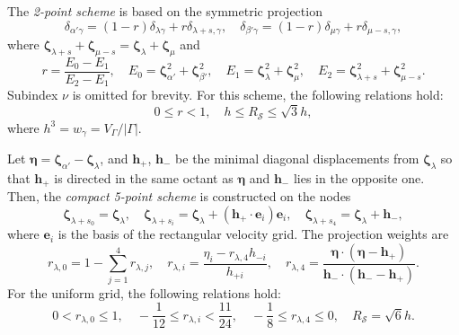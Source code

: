 \documentclass[10pt]{article}
\newcommand{\bzeta}{\boldsymbol{\zeta}}
\newcommand{\bh}{\boldsymbol{h}}
\newcommand{\be}{\boldsymbol{e}}
\begin{document}
The \emph{2-point scheme} is based on the symmetric projection
\begin{equation}\label{eq:uniform_projection}
    \delta_{\alpha'\gamma} = (1-r)\delta_{\lambda\gamma} + r\delta_{\lambda+s,\gamma}, \quad
    \delta_{\beta'\gamma} = (1-r)\delta_{\mu\gamma} + r\delta_{\mu-s,\gamma},
\end{equation}
where \(\bzeta_{\lambda+s} + \bzeta_{\mu-s} = \bzeta_{\lambda} + \bzeta_{\mu}\) and
\begin{equation}\label{eq:stencil_weights2}
    r = \frac{E_0-E_1}{E_2-E_1}, \quad
    E_0 = \bzeta_{\alpha'}^2 + \bzeta_{\beta'}^2, \quad
    E_1 = \bzeta_{\lambda}^2 + \bzeta_{\mu}^2, \quad
    E_2 = \bzeta_{\lambda+s}^2 + \bzeta_{\mu-s}^2.
\end{equation}
Subindex \(\nu\) is omitted for brevity.
For this scheme, the following relations hold:
\begin{equation}\label{eq:weights_ranges2}
    0 \leq r < 1, \quad h \leq R_{\mathcal{S}} \leq \sqrt3h,
\end{equation}
where \(h^3 = w_\gamma = V_\Gamma/|\Gamma|\).

Let \(\boldsymbol{\eta} = \bzeta_{\alpha'} - \bzeta_{\lambda}\),
and \(\bh_+\), \(\bh_-\) be the minimal diagonal displacements from \(\bzeta_{\lambda}\)
so that \(\bh_+\) is directed in the same octant as \(\boldsymbol{\eta}\)
and \(\bh_-\) lies in the opposite one.
Then, the \emph{compact 5-point scheme} is constructed on the nodes
\begin{equation}\label{eq:stencil_nodes5}
    \bzeta_{\lambda+s_0} = \bzeta_{\lambda}, \quad
    \bzeta_{\lambda+s_i} = \bzeta_{\lambda} + (\bh_+\cdot \be_i)\be_i, \quad
    \bzeta_{\lambda+s_4} = \bzeta_{\lambda} + \bh_-,
\end{equation}
where \(\be_i\) is the basis of the rectangular velocity grid. The projection weights are
\begin{equation}\label{eq:stencil_weights5}
    r_{\lambda,0} = 1 - \sum_{j=1}^4 r_{\lambda,j}, \quad
    r_{\lambda,i} = \frac{\eta_i - r_{\lambda,4}h_{-i}}{h_{+i}}, \quad
    r_{\lambda,4} = \frac{\boldsymbol{\eta}\cdot(\boldsymbol{\eta} - \bh_+)}
        {\bh_-\cdot(\bh_- - \bh_+)}.
\end{equation}
For the uniform grid, the following relations hold:
\begin{equation}\label{eq:weights_ranges5}
    0 < r_{\lambda,0} \leq 1, \quad
    -\frac1{12} \leq r_{\lambda,i} < \frac{11}{24}, \quad
    -\frac18 \leq r_{\lambda,4} \leq 0, \quad
    R_\mathcal{S} = \sqrt6h.
\end{equation}
\end{document}
